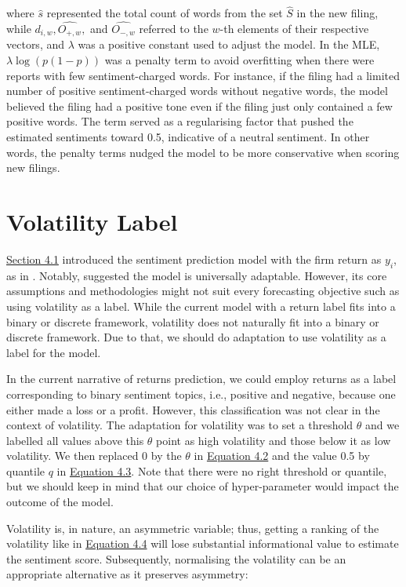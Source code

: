 \documentclass[logo,bsc,singlespacing,parskip]{infthesis}
\begin{document}
where $\hat{s}$ represented the total count of words from the set $\hat{S}$ in the new filing, while $d_{i,w}, \hat{O_{+,w}},$ and $ \hat{O_{-,w}}$ referred to the $w$-th elements of their respective vectors, and $\lambda$ was a positive constant used to adjust the model. In the MLE, $\lambda \log(p(1 - p))$ was a penalty term to avoid overfitting when there were reports with few sentiment-charged words. For instance, if the filing had a limited number of positive sentiment-charged words without negative words, the model believed the filing had a positive tone even if the filing just only contained a few positive words. The term served as a regularising factor that pushed the estimated sentiments toward 0.5, indicative of a neutral sentiment. In other words, the penalty terms nudged the model to be more conservative when scoring new filings. 

\section{Volatility Label}
\label{sec:volatility_label}
\hyperref[subsec:model]{Section 4.1} introduced the sentiment prediction model with the firm return as $y_i$, as in \cite{ke2020predicting}. Notably, \cite{ke2020predicting} suggested the model is universally adaptable. However, its core assumptions and methodologies might not suit every forecasting objective such as using volatility as a label. While the current model with a return label fits into a binary or discrete framework, volatility does not naturally fit into a binary or discrete framework. Due to that, we should do adaptation to use volatility as a label for the model. 

In the current narrative of returns prediction, we could employ returns as a label corresponding to binary sentiment topics, i.e., positive and negative, because one either made a loss or a profit. However, this classification was not clear in the context of volatility. The adaptation for volatility was to set a threshold $\theta$ and we labelled all values above this $\theta$ point as high volatility and those below it as low volatility. We then replaced 0 by the $\theta$ in \hyperref[4.2]{Equation 4.2} and the value 0.5 by quantile $q$ in \hyperref[4.3]{Equation 4.3}. Note that there were no right threshold or quantile, but we should keep in mind that our choice of hyper-parameter would impact the outcome of the model. 

Volatility is, in nature, an asymmetric variable; thus, getting a ranking of the volatility like in \hyperref[4.4]{Equation 4.4}  will lose substantial informational value to estimate the sentiment score. Subsequently, normalising the volatility can be an appropriate alternative as it preserves asymmetry:
\end{document}
